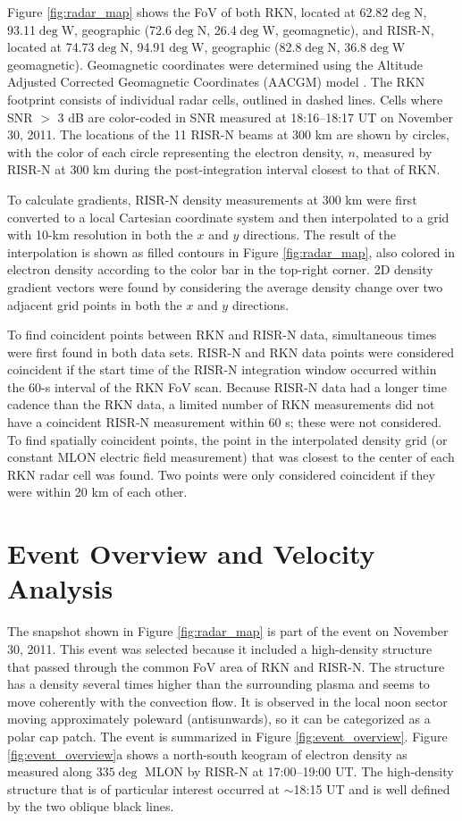 Figure \ref{fig:radar_map} shows the FoV of both RKN, located at 62.82\(\deg\)N, 93.11\(\deg\)W, geographic (72.6\(\deg\)N, 26.4\(\deg\)W, geomagnetic), and RISR-N, located at 74.73\(\deg\)N, 94.91\(\deg\)W, geographic (82.8\(\deg\)N, 36.8\(\deg\)W geomagnetic).  Geomagnetic coordinates were determined using the Altitude Adjusted Corrected Geomagnetic Coordinates (AACGM) model \citep{Shepherd2014}.  The RKN footprint consists of individual radar cells, outlined in dashed lines.  Cells where SNR \(>\) 3 dB are color-coded in SNR measured at 18:16--18:17 UT on November 30, 2011. The locations of the 11 RISR-N beams at 300 km are shown by circles, with the color of each circle representing the electron density, \(n\), measured by RISR-N at 300 km during the post-integration interval closest to that of RKN.

To calculate gradients, RISR-N density measurements at 300 km were first converted to a local Cartesian coordinate system and then interpolated to a grid with 10-km resolution in both the \(x\) and \(y\) directions.  The result of the interpolation is shown as filled contours in Figure \ref{fig:radar_map}, also colored in electron density according to the color bar in the top-right corner.  2D density gradient vectors were found by considering the average density change over two adjacent grid points in both the \(x\) and \(y\) directions.


To find coincident points between RKN and RISR-N data, simultaneous times were first found in both data sets.  RISR-N and RKN data points were considered coincident if the start time of the RISR-N integration window occurred within the 60-s interval of the RKN FoV scan.  Because RISR-N data had a longer time cadence than the RKN data, a limited number of RKN measurements did not have a coincident RISR-N measurement within 60 s; these were not considered. To find spatially coincident points, the point in the interpolated density grid (or constant MLON electric field measurement) that was closest to the center of each RKN radar cell was found.  Two points were only considered coincident if they were within 20 km of each other.

\section{Event Overview and Velocity Analysis}
The snapshot shown in Figure \ref{fig:radar_map} is part of the event on November 30, 2011.  This event was selected because it included a high-density structure that passed through the common FoV area of RKN and RISR-N.  The structure has a density several times higher than the surrounding plasma and seems to move coherently with the convection flow.  It is observed in the local noon sector moving approximately poleward (antisunwards), so it can be categorized as a polar cap patch. The event is summarized in Figure \ref{fig:event_overview}.  Figure \ref{fig:event_overview}a shows a north-south keogram of electron density as measured along \(335\deg\) MLON by RISR-N at 17:00--19:00 UT.  The high-density structure that is of particular interest occurred at \(\sim\)18:15 UT and is well defined by the two oblique black lines.

